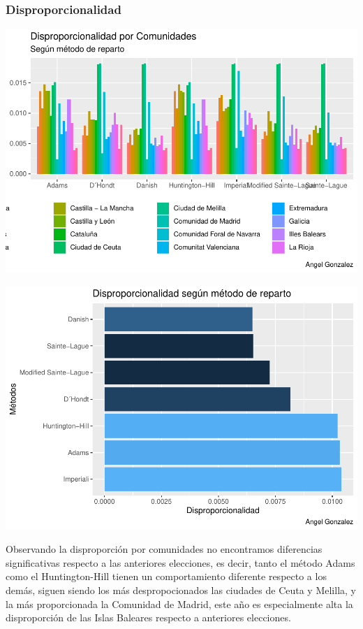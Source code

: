 \documentclass[12pt,a4paper,]{book}
\numberwithin{dummy}{section}
\theoremstyle{ocrenumbox}
\theoremstyle{blacknumex}
\theoremstyle{blacknumbox}
\theoremstyle{ocrenum}
\theoremstyle{ocrenum}
\begin{document}
\hypertarget{disproporcionalidad-6}{%
\subsubsection{Disproporcionalidad}\label{disproporcionalidad-6}}

\begin{center}\includegraphics[width=0.95\linewidth]{figurasR/unnamed-chunk-75-1} \end{center}

\begin{center}\includegraphics[width=0.95\linewidth]{figurasR/unnamed-chunk-75-2} \end{center}

Observando la disproporción por comunidades no encontramos diferencias
significativas respecto a las anteriores elecciones, es decir, tanto el
método Adams como el Huntington-Hill tienen un comportamiento diferente
respecto a los demás, siguen siendo los más despropocionados las
ciudades de Ceuta y Melilla, y la más proporcionada la Comunidad de
Madrid, este año es especialmente alta la disproporción de las Islas
Baleares respecto a anteriores elecciones.
\end{document}
